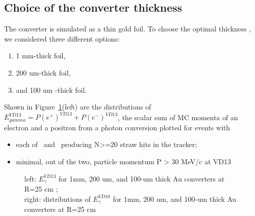 \subsection{Choice of the converter thickness}

The converter is simulated as a thin gold foil. To choose the optimal thickness ,
we considered three different options:
\begin{enumerate}
\item 
  1 mm-thick foil, 
\item
  200 um-thick foil, 
\item
 and 100 um -thick foil.
\end{enumerate}

Shown in Figure~\ref{figure:sum_mom_vd13}(left) are the distributions of $E_{gamma}^{VD13} = P(e^+)^{VD13} + P(e^-)^{VD13}$,
the scalar sum of MC momenta of an electron and a positron from a photon conversion
plotted for events with

\begin{itemize}
\item
  each of \eplus\ and \eminus\ producing N>=20 straw hits in the tracker;
\item
  minimal, out of the two, particle momentum P > 30 MeV/c at VD13 
\end{itemize}

\begin{figure}[H]
  \caption{
    \label{figure:sum_mom_vd13}
    left: $E_\gamma^{VD13}$ for 1mm, 200 um, and 100-um thick Au converters at R=25 cm ; \\
    right: distributions of $E_\gamma^{VD10}$ for 1mm, 200 um, and 100-um thick Au converters at R=25 cm
  }
\end{figure}

